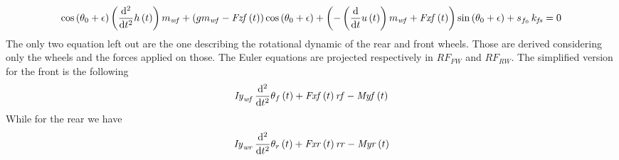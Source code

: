 %
\footnotesize
\begin{equation}
\cos \left( \theta_{0}+\epsilon \right) \left( {\frac {{\rm d}^{2}}{{\rm d}{t}^{2}}}h \left( t \right) \right) m_{{\it wf}}+ \left( gm_{{\it wf}}-{\it Fzf} \left( t\right)  \right) \cos \left( \theta_{0}+\epsilon \right) + \left( -\left( {\frac {\rm d}{{\rm d}t}}u \left( t \right)  \right) m_{{\it wf}}+{\it Fxf} \left( t \right)  \right) \sin \left( \theta_{0}+\epsilon \right) +s_{f_{0}}\,k_{{\it fs}} = 0
\end{equation}
\normalsize
%
The only two equation left out are the one describing the rotational dynamic of the rear and front wheels. Those are derived considering only the wheels and the forces applied on those. The Euler equations are projected respectively in $RF_{FW}$ and $RF_{RW}$. The simplified version for the front is the following
%
\begin{equation}
    {\it Iy}_{{\it wf}}\,{\frac {{\rm d}^{2}}{{\rm d}{t}^{2}}}\theta_{f}
    \left( t \right) +{\it Fxf} \left( t \right) {\it rf}-{\it Myf}
    \left( t \right)    
\end{equation}
%
While for the rear we have
%
\begin{equation}
    {\it Iy}_{{\it wr}}\,{\frac {{\rm d}^{2}}{{\rm d}{t}^{2}}}\theta_{r}
    \left( t \right) +{\it Fxr} \left( t \right) {\it rr}-{\it Myr}
    \left( t \right)        
\end{equation}
%
